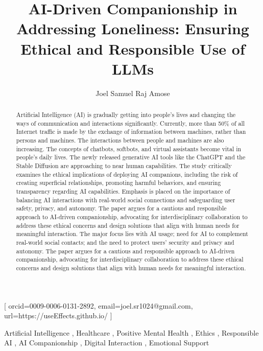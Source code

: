 

\title{AI-Driven Companionship in Addressing Loneliness: Ensuring Ethical and Responsible Use of LLMs}

\author{Joel Samuel Raj Amose}[
    orcid=0009-0006-0131-2892,
    email=joel.sr1024@gmail.com,
    url=https://useEffects.github.io/
]

\begin{abstract}
    Artificial Intelligence (AI) is gradually getting into people's lives and changing the ways of communication and interactions significantly. Currently, more than 50\% of all Internet traffic is made by the exchange of information between machines, rather than persons and machines. The interactions between people and machines are also increasing. The concepts of chatbots, softbots, and virtual assistants become vital in people's daily lives. The newly released generative AI tools like the ChatGPT and the Stable Diffusion are approaching to near human capabilities. The study critically examines the ethical implications of deploying AI companions, including the risk of creating superficial relationships, promoting harmful behaviors, and ensuring transparency regarding AI capabilities. Emphasis is placed on the importance of balancing AI interactions with real-world social connections and safeguarding user safety, privacy, and autonomy. The paper argues for a cautious and responsible approach to AI-driven companionship, advocating for interdisciplinary collaboration to address these ethical concerns and design solutions that align with human needs for meaningful interaction. The major focus lies with AI usage; need for AI to complement real-world social contacts; and the need to protect users' security and privacy and autonomy. The paper argues for a cautious and responsible approach to AI-driven companionship, advocating for interdisciplinary collaboration to address these ethical concerns and design solutions that align with human needs for meaningful interaction.
\end{abstract}

\begin{keywords}
    Artificial Intelligence \sep
    Healthcare \sep
    Positive Mental Health \sep
    Ethics \sep
    Responsible AI \sep
    AI Companionship \sep
    Digital Interaction \sep
    Emotional Support
\end{keywords}

\maketitle
